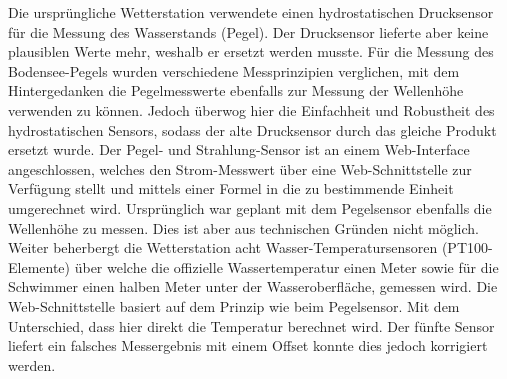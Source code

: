 \documentclass[10pt]{article}
\begin{document}
\begin{multicols}{2}
Die ursprüngliche Wetterstation verwendete einen hydrostatischen Drucksensor für die Messung des Wasserstands (Pegel). Der Drucksensor lieferte aber keine plausiblen Werte mehr, weshalb er ersetzt werden musste. Für die Messung des Bodensee-Pegels wurden verschiedene Messprinzipien verglichen, mit dem Hintergedanken die Pegelmesswerte ebenfalls zur Messung der Wellenhöhe verwenden zu können. Jedoch überwog hier die Einfachheit und Robustheit des hydrostatischen Sensors, sodass der alte Drucksensor durch das gleiche Produkt ersetzt wurde. Der Pegel- und Strahlung-Sensor ist an einem Web-Interface angeschlossen, welches den Strom-Messwert über eine Web-Schnittstelle zur Verfügung stellt und mittels einer Formel in die zu bestimmende Einheit umgerechnet wird. Ursprünglich war geplant mit dem Pegelsensor ebenfalls die Wellenhöhe zu messen. Dies ist aber aus technischen Gründen nicht möglich.\\ 
Weiter beherbergt die Wetterstation acht Wasser-Temperatursensoren (PT100-Elemente) über welche die offizielle Wassertemperatur einen Meter sowie für die Schwimmer einen halben Meter unter der Wasseroberfläche, gemessen wird. Die Web-Schnittstelle basiert auf dem Prinzip wie beim Pegelsensor. Mit dem Unterschied, dass hier direkt die Temperatur berechnet wird. Der fünfte Sensor liefert ein falsches Messergebnis mit einem Offset konnte dies jedoch korrigiert werden.\\

\end{multicols}
\end{document}
